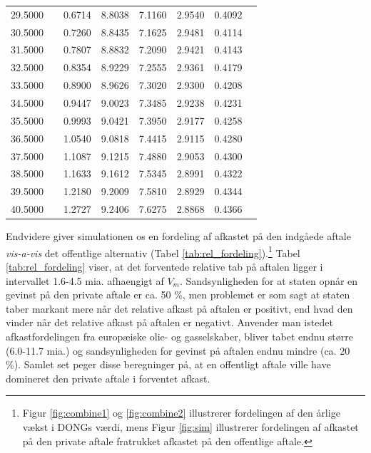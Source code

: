 \documentclass{article}
\begin{document}
\begin{table}[h]
\begin{tabularx}{\linewidth}{cXcccccr}
 29.5000&&0.6714&8.8038&7.1160&2.9540&0.4092\\
 30.5000&&0.7260&8.8435&7.1625&2.9481&0.4114\\
 31.5000&&0.7807&8.8832&7.2090&2.9421&0.4143\\
 32.5000&&0.8354&8.9229&7.2555&2.9361&0.4179\\
 33.5000&&0.8900&8.9626&7.3020&2.9300&0.4208\\
 34.5000&&0.9447&9.0023&7.3485&2.9238&0.4231\\
 35.5000&&0.9993&9.0421&7.3950&2.9177&0.4258\\
 36.5000&&1.0540&9.0818&7.4415&2.9115&0.4280\\
 37.5000&&1.1087&9.1215&7.4880&2.9053&0.4300\\
 38.5000&&1.1633&9.1612&7.5345&2.8991&0.4322\\
 39.5000&&1.2180&9.2009&7.5810&2.8929&0.4344\\
 40.5000&&1.2727&9.2406&7.6275&2.8868&0.4366\\

\bottomrule[1pt]
	\end{tabularx}
	\begin{minipage}{\linewidth}
	\end{minipage}
\end{table}


Endvidere giver simulationen os en fordeling af afkastet på den indgåede aftale \emph{vis-a-vis} det offentlige alternativ (Tabel \ref{tab:rel_fordeling}).\footnote{Figur \ref{fig:combine1} og \ref{fig:combine2} illustrerer fordelingen af den årlige vækst i DONGs værdi, mens Figur \ref{fig:sim} illustrerer fordelingen af afkastet på den private aftale fratrukket afkastet på den offentlige aftale.} Tabel \ref{tab:rel_fordeling} viser, at det forventede relative tab på aftalen ligger i intervallet 1.6-4.5 mia. afhaengigt af $V_m$. Sandsynligheden for at staten opnår en gevinst på den private aftale er ca. 50 \%, men problemet er som sagt at staten taber markant mere når det relative afkast på aftalen er positivt, end hvad den vinder når det relative afkast på aftalen er negativt. Anvender man istedet afkastfordelingen fra europæiske olie- og gasselskaber, bliver tabet endnu større (6.0-11.7 mia.) og sandsynligheden for gevinst på aftalen endnu mindre (ca. 20  \%). Samlet set peger disse beregninger på, at en offentligt aftale ville have domineret den private aftale i forventet afkast.
\end{document}
